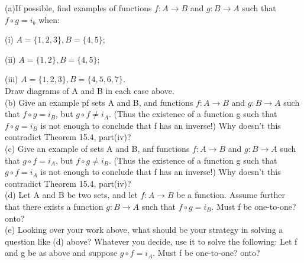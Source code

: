 \documentclass[11pt, a4paper, UTF8]{ctexart}
\begin{document}
\begin{problem}[UD:15.7]
(a)If possible, find examples of functions \(f:A \rightarrow B\) and \(g:B \rightarrow A\) such that \(f \circ g = i_{b}\) when:

(i) \(A = \{1,2,3\}, B = \{4,5\}\);

(ii) \(A = \{1,2\}, B = \{4,5\}\);

(iii) \(A = \{1,2,3\}, B = \{4,5,6,7\}\).\\
Draw diagrams of A and B in each case above.\\
(b) Give an example pf sets A and B, and functions \(f:A \rightarrow B\) and \(g:B \rightarrow A\) such that \(f \circ g = i_{B}\), but \(g \circ f \neq i_{A}\). (Thus the existence of a function g such that \(f \circ g = i_{B}\) is not enough to conclude that f has an inverse!) Why doesn't this contradict Theorem 15.4, part(iv)?\\
(c) Give an example of sets A and B, anf functions \(f:A \rightarrow B\) and \(g:B \rightarrow A\) such that \(g \circ f = i_{A}\), but \(f \circ g \neq i_{B}\). (Thus the existence of a function g such that \(g \circ f = i_{A}\) is not enough to conclude that f has an inverse!) Why doesn't this contradict Theorem 15.4, part(iv)?\\
(d) Let A and B be two sets, and let \(f: A \rightarrow B\) be a function. Assume further that there exists a function \(g:B \rightarrow A\) such that \(f \circ g = i_{B}\). Must f be one-to-one? onto?\\
(e) Looking over your work above, what should be your strategy in solving a question like (d) above? Whatever you decide, use it to solve the following: Let f and g be as above and suppose \(g \circ f = i_{A}\). Must f be one-to-one? onto?
\end{problem}
\end{document}
